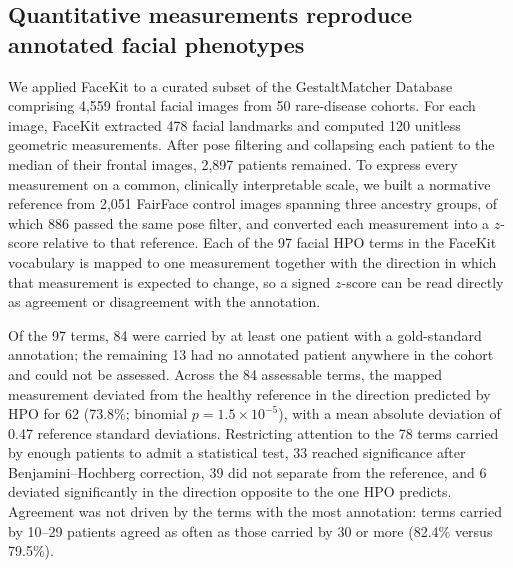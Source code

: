 %

\subsection{Quantitative measurements reproduce annotated facial phenotypes}

We applied FaceKit to a curated subset of the GestaltMatcher Database comprising
4,559 frontal facial images from 50 rare-disease cohorts. For each image, FaceKit
extracted 478 facial landmarks and computed 120 unitless geometric measurements.
After pose filtering and collapsing each patient to the median of their frontal
images, 2,897 patients remained. To express every measurement on a common,
clinically interpretable scale, we built a normative reference from 2,051 FairFace
control images spanning three ancestry groups, of which 886 passed the same pose
filter, and converted each measurement into a $z$-score relative to that reference.
Each of the 97 facial HPO terms in the FaceKit vocabulary is mapped to one
measurement together with the direction in which that measurement is expected to
change, so a signed $z$-score can be read directly as agreement or disagreement
with the annotation.

Of the 97 terms, 84 were carried by at least one patient with a gold-standard
annotation; the remaining 13 had no annotated patient anywhere in the cohort and
could not be assessed. Across the 84 assessable terms, the mapped measurement
deviated from the healthy reference in the direction predicted by HPO for 62
(73.8\%; binomial $p=1.5\times10^{-5}$), with a mean absolute deviation of 0.47
reference standard deviations. Restricting attention to the 78 terms carried by
enough patients to admit a statistical test, 33 reached significance after
Benjamini--Hochberg correction, 39 did not separate from the reference, and 6
deviated significantly in the direction opposite to the one HPO predicts. Agreement
was not driven by the terms with the most annotation: terms carried by 10--29
patients agreed as often as those carried by 30 or more (82.4\% versus 79.5\%).

